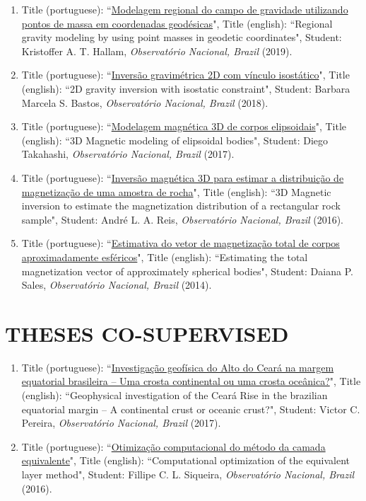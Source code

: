 \documentclass[paper=letter,fontsize=11pt]{scrartcl} %
\newcommand{\sepspace}{\vspace*{1em}}		%
\newcommand{\NewPart}[2]{\section*{\uppercase{#1} #2}}
\newcommand{\ThesisEntry}[6]{
		\noindent [#1] Title (portuguese): ``#2", Title (english): ``#3", Student: #4, \textit{#5} (#6).}
\begin{document}
\begin{enumerate}
	
\item\ThesisEntry{PhD}{\href{http://www.pinga-lab.org/thesis/hallam-phd.html}{Modelagem regional do campo de gravidade utilizando pontos de massa em coordenadas geod{\' e}sicas}}{Regional gravity modeling by using point masses in geodetic coordinates}{Kristoffer A. T. Hallam}{Observat\'{o}rio Nacional, Brazil}{2019}

\item\ThesisEntry{MSc}{\href{http://www.pinga-lab.org/thesis/marcela-msc.html}{Invers{\~ a}o gravim{\' e}trica 2D com v{\' i}nculo isost{\' a}tico}}{2D gravity inversion with isostatic constraint}{Barbara Marcela S. Bastos}{Observat\'{o}rio Nacional, Brazil}{2018}

\item\ThesisEntry{MSc}{\href{http://www.pinga-lab.org/thesis/takahashi-msc.html}{Modelagem magn\'{e}tica 3D de corpos elipsoidais}}{3D Magnetic modeling of elipsoidal bodies}{Diego Takahashi}{Observat\'{o}rio Nacional, Brazil}{2017}

\item\ThesisEntry{MSc}{\href{http://www.pinga-lab.org/thesis/andre-msc.html}{Invers\~{a}o magn\'{e}tica 3D para estimar a distribui\c{c}\~{a}o de magnetiza\c{c}\~{a}o de uma amostra de rocha}}{3D Magnetic inversion to estimate the magnetization distribution of a rectangular rock sample}{Andr\'{e} L. A. Reis}{Observat\'{o}rio Nacional, Brazil}{2016}

\item\ThesisEntry{MSc}{\href{http://www.pinga-lab.org/thesis/daiana-msc.html}{Estimativa do vetor de magnetiza\c{c}\~{a}o total de corpos aproximadamente esf\'{e}ricos}}{Estimating the total magnetization vector of approximately spherical bodies}{Daiana P. Sales}{Observat\'{o}rio Nacional, Brazil}{2014}

\end{enumerate}

\sepspace

\NewPart{Theses Co-supervised}{}

\begin{enumerate}

\item\ThesisEntry{MSc}{\href{http://www.pinga-lab.org/thesis/victor-msc.html}{Investiga\c{c}\~{a}o geof\'{i}sica do Alto do Cear\'{a} na margem equatorial brasileira -- Uma crosta continental ou uma crosta oce\^{a}nica?}}{Geophysical investigation of the Cear\'{a} Rise in the brazilian equatorial margin -- A continental crust or oceanic crust?}{Victor C. Pereira}{Observat\'{o}rio Nacional, Brazil}{2017}

\item\ThesisEntry{PhD}{\href{http://www.pinga-lab.org/thesis/siqueira-phd.html}{Otimiza\c{c}\~{a}o computacional do m\'{e}todo da camada equivalente}}{Computational optimization of the equivalent layer method}{Fillipe C. L. Siqueira}{Observat\'{o}rio Nacional, Brazil}{2016}

\end{enumerate}
\end{document}
